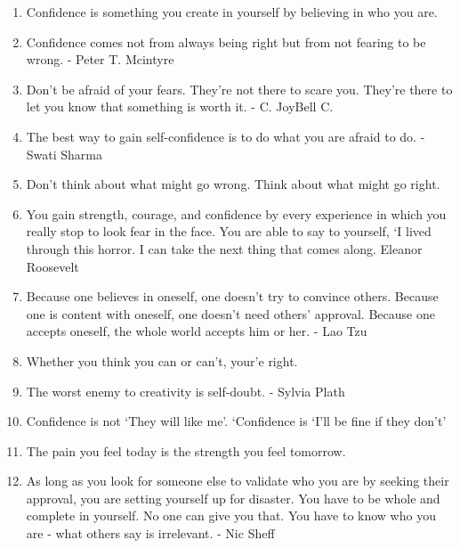 \begin{enumerate}
            \item Confidence is something you create in yourself by believing in who you are.

            \item Confidence comes not from always being right but from not fearing to be wrong. - Peter T. Mcintyre

            \item Don’t be afraid of your fears. They’re not there to scare you. They’re there to let you know that something is worth it. - C. JoyBell C.

            \item The best way to gain self-confidence is to do what you are afraid to do. - Swati Sharma

            \item Don’t think about what might go wrong. Think about what might go right.

            \item You gain strength, courage, and confidence by every experience in which you really stop to look fear in the face. You are able to say to yourself, ‘I lived through this horror. I can take the next thing that comes along. Eleanor Roosevelt

            \item Because one believes in oneself, one doesn’t try to convince others. Because one is content with oneself, one doesn’t need others’ approval. Because one accepts oneself, the whole world accepts him or her. - Lao Tzu

            \item Whether you think you can or can’t, your’e right.

            \item The worst enemy to creativity is self-doubt. - Sylvia Plath

            \item Confidence is not `They will like me'. `Confidence is `I’ll be fine if they don’t'

            \item The pain you feel today is the strength you feel tomorrow.

            \item As long as you look for someone else to validate who you are by seeking their approval, you are setting yourself up for disaster. You have to be whole and complete in yourself. No one can give you that. You have to know who you are - what others say is irrelevant. - Nic Sheff


\end{enumerate}
